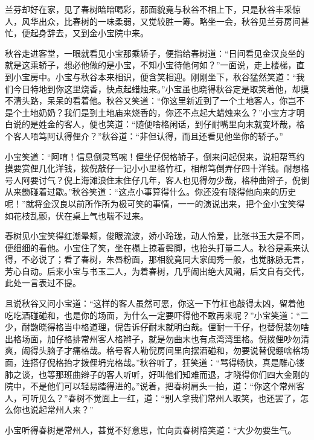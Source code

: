 \documentclass[12pt,UTF8]{ctexbook}
\begin{document}
{{{兰芬却好在家，见了春树暗暗喝彩，那面貌竟与秋谷不相上下，只是秋谷丰采惊人，风华出众，比春树的一味柔弱，又觉较胜一筹。略坐一会，秋谷见兰芬房间甚忙，便起身辞去，又到金小宝院中来。

秋谷走进客堂，一眼就看见小宝那乘轿子，便指给春树道：“日间看见金汉良坐的就是这乘轿子，想必他做的是小宝，不知小宝待他何如？”一面说，走上楼梯，直到小宝房中。小宝与秋谷本来相识，便含笑相迎。刚刚坐下，秋谷猛然笑道：“我们今日特地到你这里烧香，快点起蜡烛来。”小宝虽也晓得秋谷定是取笑着他，却摸不清头路，呆呆的看着他。秋谷又笑道：“你这里新近到了一个土地客人，你岂不是个土地奶奶？我们是到土地庙来烧香的，你还不点起大蜡烛来么？”小宝方才明白说的是姓金的客人，便也笑道：“随便啥格闲话，到仔耐嘴里向末就变坏哉，格个客人唔笃阿认得俚介？”秋谷道：“非但认得，而且还看见他坐你的轿子。”

小宝笑道：“阿唷！信息倒灵笃啘！俚坐仔倪格轿子，倒来问起倪来，说相帮笃约摸要赏俚几化洋钱，拨倪敲仔一记小小里格竹杠，相帮笃倒弄仔四十洋钱。耐想格号人阿要讨气？倪上海滩浪住末住仔几年，客人也见得勿少哉，格种曲辫子，倪倒从来朆碰着过歇。”秋谷笑道：“这点小事算得什么。你还没有晓得他向来的历史呢！”就将金汉良以前所作所为极可笑的事情，一一的演说出来，把个金小宝笑得如花枝乱颤，伏在桌上气也喘不过来。

春树见小宝笑得红潮晕颊，俊眼流波，娇小玲珑，动人怜爱，比张书玉大是不同，便细细的看他。小宝住了笑，坐在榻上掠着鬓脚，也抬头打量二人。秋谷是素来认得，不必说了；看了春树，朱唇粉面，那相貌竟同大家闺秀一般，也觉脉脉无言，芳心自动。后来小宝与书玉二人，为着春树，几乎闹出绝大风潮，后文自有交代，此处一言表过不提。

且说秋谷又问小宝道：“这样的客人虽然可恶，你这一下竹杠也敲得太凶，留着他吃吃酒碰碰和，也是你的场面，为什么一定要吓得他不敢再来呢？”小宝笑道：“二少，耐朆晓得格当中格道理，倪告诉仔耐末就明白哉。俚耐一干仔，也替倪装勿啥出格场面，加仔格排常州客人格辫子，就是勿曲末也有点湾湾里格。倪拨俚吵勿清爽，闹得头脑子才痛格哉。格号客人勒倪房间里向摆酒碰和，勿要说替倪绷啥格场面，连搭仔倪格抬才拨俚坍完格哉。”秋谷听了，狂笑道：“骂得畅快，真是雕心镂肺之谈，也等那班曲辫子的客人听听，好叫他们知难而退，才晓得你们四大金刚的院中，不是他们可以轻易踏得进的。”说着，把春树肩头一拍，道：“你这个常州客人，可听见么？”春树不觉面上一红，道：“别人拿我们常州人取笑，也还罢了，怎么你也说起常州人来？”

小宝听得春树是常州人，甚觉不好意思，忙向贡春树陪笑道：“大少勿要生气。

}}}
\end{document}
